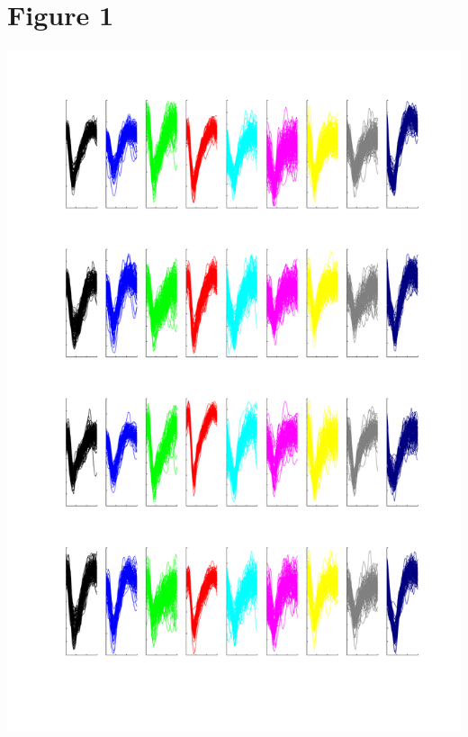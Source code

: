 \documentclass{article}
\begin{document}
\section{Figure 1}
\includegraphics[width=\textwidth]{Figure1.png}
\end{document}

